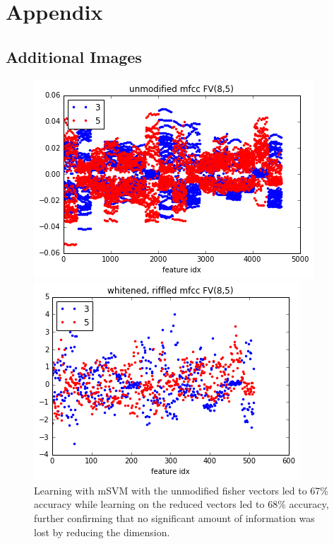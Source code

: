 \documentclass[9pt]{article}
\begin{document}



\pagebreak
\section{Appendix}

\subsection{Additional Images}

\begin{figure}[H]
    \centering
    
    \begin{minipage}[b]{0.4\textwidth}
        \includegraphics[width=\textwidth]{unmodified-mfcc8-5.png}
    \end{minipage}
    \hfill
    \begin{minipage}[b]{0.4\textwidth}
        \includegraphics[width=\textwidth]{whitened-riffled-mfcc8-5.png}
    \end{minipage}
    
    \label{fig:fv85}
    \caption{
Learning with mSVM with the unmodified fisher vectors led to 67\% accuracy
while learning on the reduced vectors led to 68\% accuracy,
further confirming that no significant amount of information was lost by reducing
the dimension.}
\end{figure}
\end{document}
